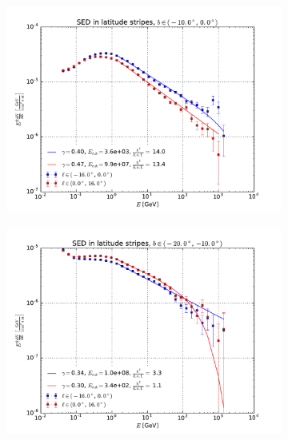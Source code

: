 \documentclass[a4paper]{article}
\begin{document}
\begin{figure}
    \begin{subfigure}{0.5\textwidth}
        \includegraphics[width=\textwidth]{spectrum_of_bottom_bubble_in_lat_stripes_0-10.pdf}
    \end{subfigure} 
    \begin{subfigure}{0.5\textwidth}
        \includegraphics[width=\textwidth]{spectrum_of_bottom_bubble_in_lat_stripes_10-20.pdf}
    \end{subfigure}
    \begin{subfigure}{0.5\textwidth}

\end{subfigure}
\end{figure}
\end{document}
